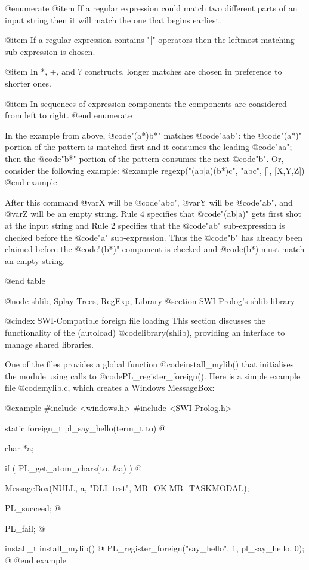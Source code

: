 {{{{{{{{{@enumerate 
@item    If a regular expression could match  two  different parts of an
input string then it will match the one that begins earliest.

@item  If a regular expression contains "|"  operators  then the leftmost matching sub-expression is chosen.

@item In *, +, and ? constructs, longer matches are chosen in preference to shorter ones.

@item In sequences of expression  components  the  components are considered from left to right.
@end enumerate

In the example from above, @code{"(a*)b*"} matches @code{"aab"}: the
@code{"(a*)"} portion of the pattern is matched first and it consumes
the leading @code{"aa"}; then the @code{"b*"} portion of the pattern
consumes the next @code{"b"}.  Or, consider the following example: 
@example
  regexp("(ab|a)(b*)c",  "abc", [], [X,Y,Z])
@end example

After this command @var{X} will be @code{"abc"}, @var{Y} will be
@code{"ab"}, and @var{Z} will be an empty string.  Rule 4 specifies that
@code{"(ab|a)"} gets first shot at the input string and Rule 2 specifies
that the @code{"ab"} sub-expression is checked before the @code{"a"}
sub-expression.  Thus the @code{"b"} has already been claimed before the
@code{"(b*)"} component is checked and @code{(b*)} must match an empty string.

@end table

@node shlib, Splay Trees, RegExp, Library
@section SWI-Prolog's shlib library

@cindex SWI-Compatible foreign file loading
This section discusses the functionality of the (autoload)
@code{library(shlib)}, providing an interface to manage shared
libraries.

One of the files provides a global function @code{install_mylib()} that
initialises the module using calls to @code{PL_register_foreign()}. Here is a
simple example file @code{mylib.c}, which creates a Windows MessageBox:

@example
#include <windows.h>
#include <SWI-Prolog.h>

static foreign_t
pl_say_hello(term_t to)
@{ char *a;

  if ( PL_get_atom_chars(to, &a) )
  @{ MessageBox(NULL, a, "DLL test", MB_OK|MB_TASKMODAL);

    PL_succeed;
  @}

  PL_fail;
@}

install_t
install_mylib()
@{ PL_register_foreign("say_hello", 1, pl_say_hello, 0);
@}
@end example

}}}}}}}}}
